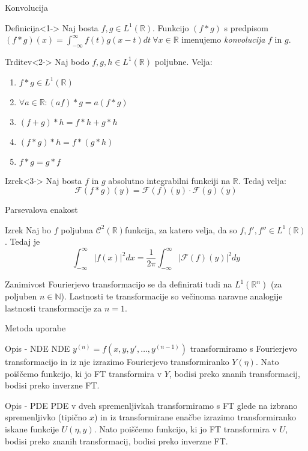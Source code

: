 \documentclass[t, 8pt]{beamer} %
\newcommand{\abs}[1]{\ensuremath{\lvert #1 \rvert}}
\newcommand{\mth}[1]{\ensuremath{\mathbb{#1}}}
\newcommand{\R}{\mth{R}}
\newcommand{\N}{\mth{N}}
\newcommand{\pojem}[1]{\emph{#1}}
\begin{document}
		\begin{frame}{Konvolucija}
			\begin{block}{Definicija}<1->
				Naj bosta $f, g\in L^1(\R)$. Funkcijo $(f*g)$ s predpisom $(f*g)(x) = \int_{-\infty}^{\infty}f(t)g(x-t)dt ~\forall x\in\R$ imenujemo \pojem{konvolucija} $f$ in $g$.
			\end{block}
			\begin{block}{Trditev}<2->
				Naj bodo $f, g, h\in L^1(\R)$ poljubne. Velja: \begin{enumerate}
					\item $f*g \in L^1(\R)$
					\item $\forall a\in \R: (af)*g = a(f*g)$
					\item $(f+g)*h = f*h + g*h$
					\item $(f*g)*h = f*(g*h)$
					\item $f*g= g*f$
				\end{enumerate} 
			\end{block}
			\begin{block}{Izrek}<3->
				Naj bosta $f$ in $g$ absolutno integrabilni funkciji na $\R$. Tedaj velja: $$\mathcal{F}(f*g)(y) = \mathcal{F}(f)(y)\cdot\mathcal{F}(g)(y)$$
			\end{block}
		\end{frame}
		
		\begin{frame}{Parsevalova enakost}
			\begin{block}{Izrek}
				Naj bo $f$ poljubna $\mathcal{C}^2(\R)$funkcija, za katero velja, da so $f, f', f''\in L^1(\R)$. Tedaj je $$\int_{-\infty}^{\infty}\abs{f(x)}^2dx = \frac{1}{2\pi}\int_{-\infty}^{\infty}\abs{\mathcal{F}(f)(y)}^2dy$$
			\end{block}
			\begin{block}{Zanimivost}
				Fourierjevo transformacijo se da definirati tudi na $L^1(\R^n)$ (za poljuben $n\in\N$). Lastnosti te transformacije so večinoma naravne analogije lastnosti transformacije za $n = 1$.
			\end{block}
		\end{frame}
		
		\begin{frame}{Metoda uporabe}
			\begin{block}{Opis - NDE}
				NDE $y^{(n)} = f(x, y, y', \ldots, y^{(n-1)})$ transformiramo s Fourierjevo transformacijo in iz nje izrazimo Fourierjevo transformiranko $Y(\eta)$. Nato poiščemo funkcijo, ki jo FT transformira v $Y$, bodisi preko znanih transformacij, bodisi preko inverzne FT.
			\end{block}
			\begin{block}{Opis - PDE}
				PDE v dveh spremenljivkah transformiramo s FT glede na izbrano spremenljivko (tipično $x$) in iz transformirane enačbe izrazimo transformiranko iskane funkcije $U(\eta, y)$. Nato poiščemo funkcijo, ki jo FT transformira v $U$, bodisi preko znanih transformacij, bodisi preko inverzne FT.
			\end{block}
		\end{frame}
		
\end{document}
